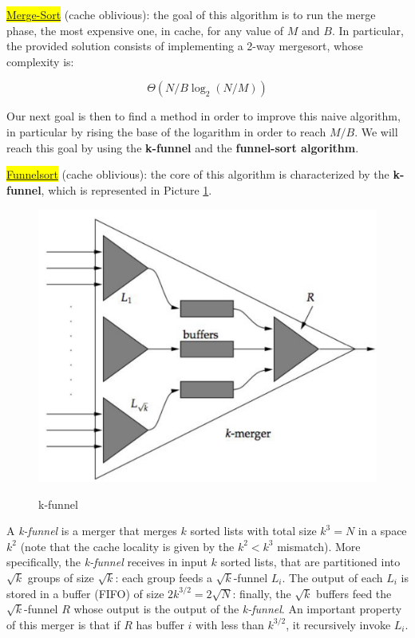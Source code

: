 \colorbox{yellow}{\underline{Merge-Sort}} (cache oblivious): the goal of this algorithm is to run the merge phase, the most expensive one, in cache, for any value of $M$ and $B$. In particular, the provided solution consists of implementing a 2-way mergesort, whose complexity is:

$$
\Theta(N/B \log_2(N/M))
$$

Our next goal is then to find a method in order to improve this naive algorithm, in particular by rising the base of the logarithm in order to reach $M/B$. We will reach this goal by using the \textbf{k-funnel} and the \textbf{funnel-sort algorithm}.

\colorbox{yellow}{\underline{Funnelsort}} (cache oblivious): the core of this algorithm is characterized by the \textbf{k-funnel}, which is represented in Picture \ref{funnel}.

\begin{figure}[h!]
		\centering
		\includegraphics[scale = 0.5]{img/funnel.jpg}
        \label{funnel}
        \caption{k-funnel}
\end{figure}

A \textit{k-funnel} is a merger that merges $k$ sorted lists with total size $k^3 = N$ in a space $k^2$ (note that the cache locality is given by the $k^2 < k^3$ mismatch). More specifically, the \textit{k-funnel} receives in input $k$ sorted lists, that are partitioned into $\sqrt{k}$ groups of size $\sqrt{k}$: each group feeds a $\sqrt{k}$-funnel $L_i$. The output of each $L_i$ is stored in a buffer (FIFO) of size $2k^{3/2} = 2\sqrt{N}$: finally, the $\sqrt{k}$ buffers feed the $\sqrt{k}$-funnel $R$ whose output is the output of the \textit{k-funnel}. An important property of this merger is that if $R$ has buffer $i$ with less than $k^{3/2}$, it recursively invoke $L_i$.

